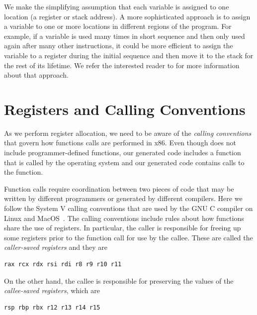 \documentclass[11pt]{book}
\begin{document}
We make the simplifying assumption that each variable is assigned to
one location (a register or stack address). A more sophisticated
approach is to assign a variable to one or more locations in different
regions of the program.  For example, if a variable is used many times
in short sequence and then only used again after many other
instructions, it could be more efficient to assign the variable to a
register during the initial sequence and then move it to the stack for
the rest of its lifetime. We refer the interested reader to
\citet{Cooper:2011aa} for more information about that approach.


\section{Registers and Calling Conventions}
\label{sec:calling-conventions}

As we perform register allocation, we need to be aware of the
\emph{calling conventions}  that govern how
functions calls are performed in x86.
%
Even though \LangVar{} does not include programmer-defined functions,
our generated code includes a  function that is called by
the operating system and our generated code contains calls to the
 function.

Function calls require coordination between two pieces of code that
may be written by different programmers or generated by different
compilers. Here we follow the System V calling conventions that are
used by the GNU C compiler on Linux and
MacOS~\citep{Bryant:2005aa,Matz:2013aa}.
%
The calling conventions include rules about how functions share the
use of registers. In particular, the caller is responsible for freeing
up some registers prior to the function call for use by the callee.
These are called the \emph{caller-saved registers}
and they are
\begin{lstlisting}
rax rcx rdx rsi rdi r8 r9 r10 r11
\end{lstlisting}
On the other hand, the callee is responsible for preserving the values
of the \emph{callee-saved registers}, 
which are
\begin{lstlisting}
rsp rbp rbx r12 r13 r14 r15
\end{lstlisting}
\end{document}
